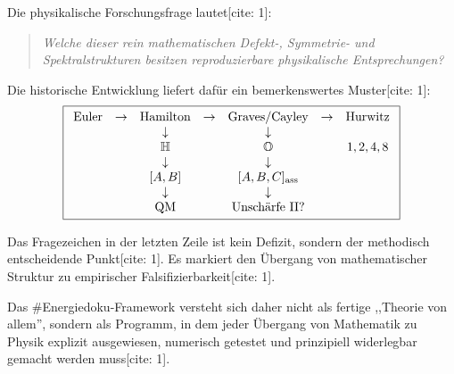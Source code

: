 \documentclass[11pt,a4paper]{article}
\newcommand{\OO}{\mathbb{O}}
\newcommand{\HH}{\mathbb{H}}
\begin{document}
Die physikalische Forschungsfrage lautet[cite: 1]:
\begin{quote}
\emph{Welche dieser rein mathematischen Defekt-, Symmetrie- und Spektralstrukturen besitzen reproduzierbare physikalische Entsprechungen?}
\end{quote}

Die historische Entwicklung liefert dafür ein bemerkenswertes Muster[cite: 1]:
\[
\boxed{
\begin{array}{ccccccc}
\text{Euler}&\to&\text{Hamilton}&\to&\text{Graves/Cayley}&\to&\text{Hurwitz}\\
&&\downarrow&&\downarrow&&\\
&&\HH&&\OO&&1,2,4,8\\
&&\downarrow&&\downarrow&&\\
&&[A,B]&&[A,B,C]_{\rm ass}\\
&&\downarrow&&\downarrow&&\\
&&\text{QM}&&\text{Unschärfe II?}
\end{array}}
\]

Das Fragezeichen in der letzten Zeile ist kein Defizit, sondern der methodisch entscheidende Punkt[cite: 1]. Es markiert den Übergang von mathematischer Struktur zu empirischer Falsifizierbarkeit[cite: 1].

Das \#Energiedoku-Framework versteht sich daher nicht als fertige ,,Theorie von allem'', sondern als Programm, in dem jeder Übergang von Mathematik zu Physik explizit ausgewiesen, numerisch getestet und prinzipiell widerlegbar gemacht werden muss[cite: 1].
\end{document}
